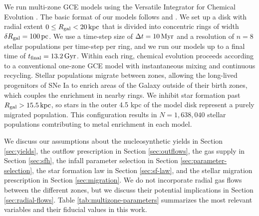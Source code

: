 \documentclass[twocolumn,twocolappendix,linenumbers]{aastex631}
\newcommand{\kpc}{\,{\rm kpc}}
\begin{document}
We run multi-zone GCE models using the Versatile Integrator for Chemical Evolution \citep[{\tt VICE};][]{johnson_impact_2020}. The basic format of our models follows \citet{johnson_stellar_2021} and \citet{dubay_galactic_2024}. We set up a disk with radial extent $0\leq R_{\rm gal}<20\kpc$ that is divided into concentric rings of width $\delta R_{\rm gal}=100\,{\rm pc}$. We use a time-step size of $\Delta t=10\,{\rm Myr}$ and a resolution of $n=8$ stellar populations per time-step per ring, and we run our models up to a final time of $t_{\rm final}=13.2\,{\rm Gyr}$. Within each ring, chemical evolution proceeds according to a conventional one-zone GCE model with instantaneous mixing and continuous recycling. Stellar populations migrate between zones, allowing the long-lived progenitors of SNe Ia to enrich areas of the Galaxy outside of their birth zones, which couples the enrichment in nearby rings. We inhibit star formation past $R_{\rm gal}>15.5\kpc$, so stars in the outer 4.5 kpc of the model disk represent a purely migrated population. This configuration results in $N=1,638,040$ stellar populations comtributing to metal enrichment in each model.

We discuss our assumptions about the nucleosynthetic yields in Section \ref{sec:yields}, the outflow prescription in Section \ref{sec:outflows}, the gas supply in Section \ref{sec:sfh}, the infall parameter selection in Section \ref{sec:parameter-selection}, the star formation law in Section \ref{sec:sf-law}, and the stellar migration prescription in Section \ref{sec:migration}. We do not incorporate radial gas flows between the different zones, but we discuss their potential implications in Section \ref{sec:radial-flows}. Table \ref{tab:multizone-parameters} summarizes the most relevant variables and their fiducial values in this work.
\end{document}
